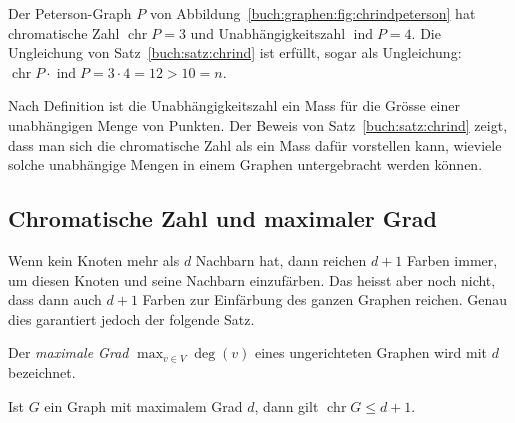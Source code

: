 \begin{beispiel}
Der Peterson-Graph $P$ von Abbildung~\ref{buch:graphen:fig:chrindpeterson}
hat chromatische Zahl $\operatorname{chr}P=3$ und Unabhängigkeitszahl
$\operatorname{ind}P=4$.
Die Ungleichung von Satz~\ref{buch:satz:chrind} ist erfüllt, sogar als
Ungleichung: $\operatorname{chr}P\cdot\operatorname{ind}P=3\cdot 4=12>10=n$.
\end{beispiel}

Nach Definition ist die Unabhängigkeitszahl ein Mass für die Grösse einer
unabhängigen Menge von Punkten.
Der Beweis von Satz~\ref{buch:satz:chrind} zeigt, dass man sich die
chromatische Zahl als ein Mass dafür vorstellen kann,
wieviele solche unabhängige 
Mengen in einem Graphen untergebracht werden können.

%
%
\subsection{Chromatische Zahl und maximaler Grad
\label{buch:subsection:chr-und-maximaler-grad}}
Wenn kein Knoten mehr als $d$ Nachbarn hat, dann reichen
$d+1$ Farben immer, um diesen Knoten und seine Nachbarn einzufärben.
Das heisst aber noch nicht, dass dann auch $d+1$ Farben zur
Einfärbung des ganzen Graphen reichen.
Genau dies garantiert jedoch der folgende Satz.

\begin{definition}
Der {\em maximale Grad}
\(
\max_{v\in V} \deg(v)
\)
eines ungerichteten Graphen 
wird mit $d$ bezeichnet.
%
\end{definition}

\begin{satz}
\label{buch:graphen:satz:chrmaxgrad}
Ist $G$ ein Graph mit maximalem Grad $d$, dann gilt 
$\operatorname{chr}G \le d+1$.
\end{satz}

